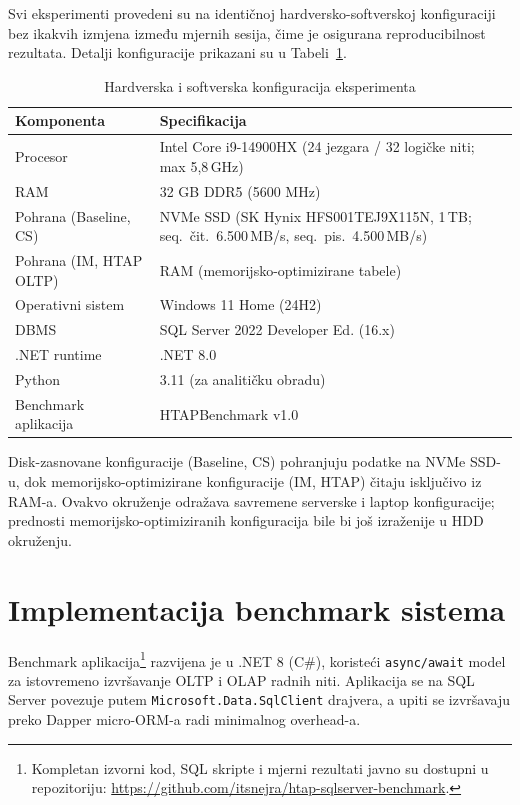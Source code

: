 Svi eksperimenti provedeni su na identičnoj hardversko-softverskoj konfiguraciji bez ikakvih izmjena između mjernih sesija, čime je osigurana reproducibilnost rezultata. Detalji konfiguracije prikazani su u Tabeli~\ref{tab:hardver}.

\begin{table}[htbp]
\centering
\caption{Hardverska i softverska konfiguracija eksperimenta}
\label{tab:hardver}
\small
\begin{tabular}{lp{8cm}}
\toprule
\textbf{Komponenta} & \textbf{Specifikacija} \\
\midrule
Procesor & Intel Core i9-14900HX (24 jezgara / 32 logičke niti; max 5{,}8\,GHz) \\
RAM & 32 GB DDR5 (5600 MHz) \\
Pohrana (Baseline, CS) & NVMe SSD (SK Hynix HFS001TEJ9X115N, 1\,TB; seq.\ čit.\ 6.500\,MB/s, seq.\ pis.\ 4.500\,MB/s) \\
Pohrana (IM, HTAP OLTP) & RAM (memorijsko-optimizirane tabele) \\
Operativni sistem & Windows 11 Home (24H2) \\
DBMS & SQL Server 2022 Developer Ed. (16.x) \\
.NET runtime & .NET 8.0 \\
Python & 3.11 (za analitičku obradu) \\
Benchmark aplikacija & HTAPBenchmark v1.0 \\
\bottomrule
\end{tabular}
\end{table}

Disk-zasnovane konfiguracije (Baseline, CS) pohranjuju podatke na NVMe SSD-u, dok memorijsko-optimizirane konfiguracije (IM, HTAP) čitaju isključivo iz RAM-a. Ovakvo okruženje odražava savremene serverske i laptop konfiguracije; prednosti memorijsko-optimiziranih konfiguracija bile bi još izraženije u HDD okruženju.

\section{Implementacija benchmark sistema}
\label{sec:implementacija}

Benchmark aplikacija\footnote{Kompletan izvorni kod, SQL skripte i mjerni rezultati javno su dostupni u repozitoriju: \url{https://github.com/itsnejra/htap-sqlserver-benchmark}.} razvijena je u .NET 8 (C\#), koristeći \texttt{async/await} model za istovremeno izvršavanje OLTP i OLAP radnih niti. Aplikacija se na SQL Server povezuje putem \mbox{\texttt{Microsoft.Data.SqlClient}} drajvera, a upiti se izvršavaju preko Dapper micro-ORM-a radi minimalnog overhead-a.

